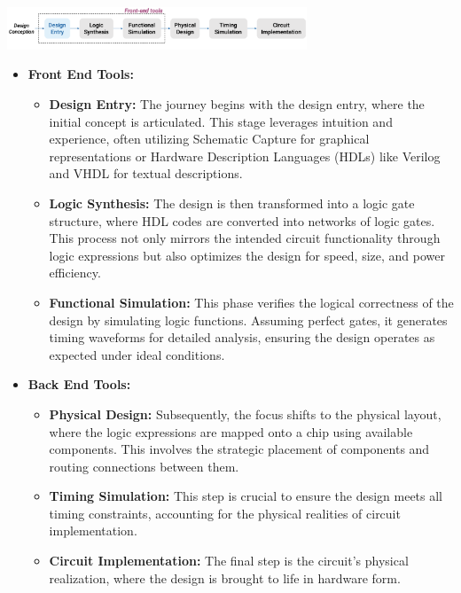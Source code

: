 \documentclass[12pt,openany, tikz,border=10pt]{book}
\begin{document}
\begin{center}
    \includegraphics[width=0.67\textwidth]{circuits/10.1.png}
\end{center}



\begin{itemize}
    \item[]\textbf{Front End Tools:}
    \begin{itemize}
    \item \textbf{Design Entry:} The journey begins with the design entry, where the initial concept is articulated. This stage leverages intuition and experience, often utilizing Schematic Capture for graphical representations or Hardware Description Languages (HDLs) like Verilog and VHDL for textual descriptions.
    \item \textbf{Logic Synthesis:} The design is then transformed into a logic gate structure, where HDL codes are converted into networks of logic gates. This process not only mirrors the intended circuit functionality through logic expressions but also optimizes the design for speed, size, and power efficiency.
    \item \textbf{Functional Simulation:} This phase verifies the logical correctness of the design by simulating logic functions. Assuming perfect gates, it generates timing waveforms for detailed analysis, ensuring the design operates as expected under ideal conditions.
 \end{itemize}
 \item[]\textbf{Back End Tools:}
    \begin{itemize}
        \item \textbf{Physical Design:} Subsequently, the focus shifts to the physical layout, where the logic expressions are mapped onto a chip using available components. This involves the strategic placement of components and routing connections between them.
    \item \textbf{Timing Simulation:} This step is crucial to ensure the design meets all timing constraints, accounting for the physical realities of circuit implementation.
    \item \textbf{Circuit Implementation:} The final step is the circuit's physical realization, where the design is brought to life in hardware form.
    \end{itemize}
\end{itemize}
\end{document}
